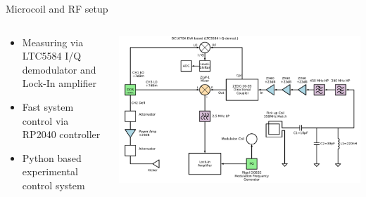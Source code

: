 \documentclass[final]{beamer}
\begin{document}
\begin{frame}[fragile]{}
\begin{columns}[T]
\begin{column}{.49\linewidth}
\begin{block}{\Large Microcoil and RF setup}
\begin{columns}
\begin{column}{0.45\columnwidth}
\begin{itemize}
					\item Measuring via LTC5584 I/Q demodulator and Lock-In amplifier
					\item Fast system control via RP2040 controller
					\item Python based experimental control system
				\end{itemize}
			\end{column}
			\begin{column}{0.45\columnwidth}
				\includegraphics[width=\columnwidth]{./figures/rfsetup.png}
			\end{column}
		\end{columns}
	\end{block}


\end{column}
\end{columns}
\end{frame}
\end{document}
